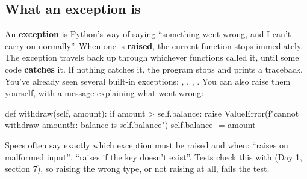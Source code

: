 \documentclass[10pt,a4paper]{article}
\begin{document}
\subsection{What an exception is}
An \textbf{exception} is Python’s way of saying “something went wrong, and I can’t carry on normally”. When one is \textbf{raised}, the current function stops immediately. The exception travels back up through whichever functions called it, until some code \textbf{catches} it. If nothing catches it, the program stops and prints a traceback.
You’ve already seen several built-in exceptions: , , , . You can also raise them yourself, with a message explaining what went wrong:
\begin{pycode}
def withdraw(self, amount):
    if amount > self.balance:
        raise ValueError(f"cannot withdraw {amount!r}: balance is {self.balance}")
    self.balance -= amount
\end{pycode}
Specs often say exactly which exception must be raised and when: “raises  on malformed input”, “raises  if the key doesn’t exist”. Tests check this with  (Day 1, section 7), so raising the wrong type, or not raising at all, fails the test.
\end{document}
